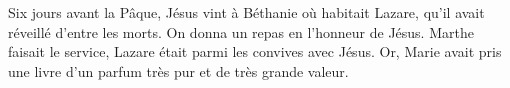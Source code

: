 Six jours avant la Pâque, Jésus vint à Béthanie où habitait Lazare,
	qu’il avait réveillé d’entre les morts.
On donna un repas en l’honneur de Jésus.
	Marthe faisait le service, Lazare était parmi les convives avec Jésus.
Or, Marie avait pris une livre d’un parfum très pur et de très grande valeur.
